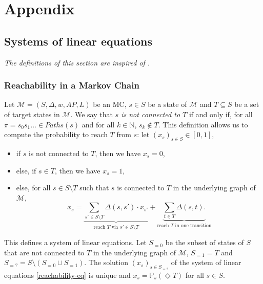 \appendix
\chapter*{Appendix}
\setcounter{chapter}{1}

\section{Systems of linear equations}
\textit{The definitions of this section are inspired of \cite{PMC}.}
\subsection{Reachability in a Markov Chain}\label{app-reach}
Let $\mathcal{M} = (S, \Delta, w, AP, L)$ be an MC, $s \in S$ be a state of $\mathcal{M}$ and $T \subseteq S$ be a set of target states in $\mathcal{M}$.
We say that \textit{$s$ is not connected to $T$} if and only if, for all $\pi = s_0s_1\dots \in Paths(s)$ and for all $k \in \mathbb{N}$, $s_k \not\in T$.
This definition allows us to compute the probability to reach $T$ from $s$:
let $(x_s)_{s \in S} \in [0, 1]$,
\begin{itemize}
	\item if $s$ is not connected to $T$, then we have $x_s = 0$,
	\item else, if $s \in T$, then we have $x_s = 1$,
	\item else, for all $s \in S \setminus T$  such that $s$ is connected to $T$ in the underlying graph of $\mathcal{M}$,
		\begin{equation}
      x_s = \underbrace{\sum_{s' \in S \setminus T} \Delta(s, s') \cdot x_{s'}}_{\text{reach $T$ via $s' \in S \setminus T$}} + \underbrace{\sum_{t \in T} \Delta(s, t).}_{\text{reach $T$ in one transition}}
			\tag{1}\label{reachability-eq}
		\end{equation}
\end{itemize}
This defines a system of linear equations.
Let $S_{=0}$ be the subset of states of $S$ that are not connected to $T$ in the underlying graph of $\mathcal{M}$, $S_{=1} = T$ and $S_{=?} = S \setminus (S_{=0} \cup S_{=1})$.
The solution $(x_s)_{s \in S_{=?}}$ of the system of linear equations \ref{reachability-eq} is unique and $x_s = \mathbb{P}_s(\Diamond T)$ for all $s \in S$.

